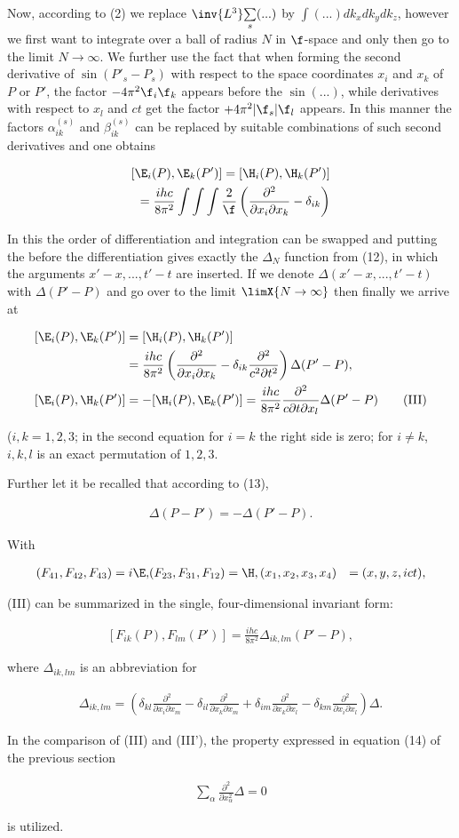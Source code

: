 \documentclass{article}
\newcommand{\nequ}[2]{
\begin{align*}
#1
\tag{#2}
\end{align*}
}
\newcommand{\uequ}[1]{
\begin{align*}
#1
\end{align*}
}
\newcommand{\sumX}[1]{\underset{#1}{\sum}}
\newcommand{\ppddXY}[3]{
\frac{\partial^2 #1}{\partial{#2}\partial{#3}}
}
\begin{document}
Now, according to (2) we replace $\inv{L^3}\sumX{s}(...)$ by $\int(...)dk_x dk_y dk_z$, however we first want to integrate over a ball of radius $N$ in $\f$-space and only then go to the limit $N\to\infty$. We further use the fact that when forming the second derivative of $\sin{(P'_s - P_s)}$ with respect to the space coordinates $x_i$ and $x_k$ of $P$ or $P'$, the factor $-4\pi^2 \f_i \f_k$ appears before the $\sin{(...)}$, while derivatives with respect to $x_l$ and $ct$ get the factor $+4\pi^2|\f_s|\f_l$ appears. In this manner the factors $\alpha_{ik}^{(s)}$ and $\beta_{ik}^{(s)}$ can be replaced by suitable combinations of such second derivatives and one obtains
\uequ{
[\E_i(P),\E_k(P')] = [\H_i(P), \H_k(P')] \\
= \frac{ihc}{8\pi^2}\int\int\int\frac{2}{\f}\left(
\frac{\partial^2}{\partial x_i \partial x_k} - \delta_{ik}
\right)
}
In this the order of differentiation and integration can be swapped and putting the before the differentiation gives exactly the $\Delta_N$ function from (12), in which the arguments $x'-x,...,t'-t$ are inserted. If we denote $\Delta(x'-x,...,t'-t)$ with $\Delta(P'-P)$ and go over to the limit $\limX{N\to\infty}$ then finally we arrive at
\nequ{
[\E_i(P), \E_k(P')] &= [\H_i(P), \H_k(P')]\\
 &= \frac{ihc}{8\pi^2}\left(
 \frac{\partial^2}{\partial x_i \partial x_k} - \delta_{ik}\frac{\partial^2}{c^2\partial t^2}
 \right)\Delta(P' - P),\\
[\E_i(P), \H_k(P')] &= -[\H_i(P), \E_k(P')]
= \frac{ihc}{8\pi^2}\frac{\partial^2}{c\partial t \partial x_l} \Delta(P'-P)
}{III}
($i,k=1,2,3$; in the second equation for $i=k$ the right side is zero; for $i\neq k$, $i,k,l$ is an exact permutation of $1,2,3$.

Further let it be recalled that according to (13),
\nequ{
\Delta(P-P') = - \Delta(P'-P).
}{13'}
With
\uequ{
(F_{41}, F_{42}, F_{43}) = i\E,& (F_{23}, F_{31}, F_{12}) = \H,
(x_1,x_2,x_3,x_4) &= (x,y,z,ict),
}
(III) can be summarized in the single, four-dimensional invariant form:
\nequ{
[F_{ik}(P), F_{lm}(P')] = \frac{ihc}{8\pi^2}\Delta_{ik,lm}(P'-P),
}{III'}
where $\Delta_{ik,lm}$ is an abbreviation for
\nequ{
\Delta_{ik,lm}=\left(
 \delta_{kl}\ppddXY{}{x_i}{x_m} - \delta_{il}\ppddXY{}{x_k}{x_m}
+\delta_{im}\ppddXY{}{x_k}{x_l} - \delta_{km}\ppddXY{}{x_i}{x_l}
\right)\Delta.
}{16}
In the comparison of (III) and (III'), the property expressed in equation (14) of the previous section
\uequ{
\sumX{\alpha}\frac{\partial^2}{\partial x_\alpha^2}\Delta = 0
}
is utilized.
\end{document}
